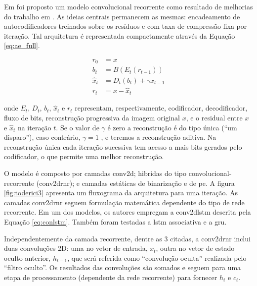 Em \cite{FullResolution2017Toderici} foi proposto um modelo convolucional recorrente como resultado de melhorias do trabalho em \cite {Variable2016Toderici}. As ideias centrais permanecem as mesmas: encadeamento de autocodificadores treinados sobre os resíduos e com taxa de compressão fixa por iteração.  Tal arquitetura é representada compactamente através da Equação \ref{eq:ae_full}. 

\begin{equation}
\label{eq:ae_full}
\begin{aligned}
r_{0} &=x\\
b_{t} &= B(E_{t}(r_{t-1})) \\
\hat{x}_{t} &= D_{t}(b_{t}) + \gamma \hat{x}_{t-1} \\
r_{t} &= x- \hat{x}_{t}
\end{aligned}
\end{equation}

\noindent onde $E_t$, $D_t$, $b_t$, $\hat{x}_t$ e $r_t$ representam, respectivamente, codificador, decodificador, fluxo de bits, reconstrução progressiva da imagem original $x$, e o residual entre $x$ e $\hat{x}_t$ na iteração $t$. Se o valor de $\gamma$ é zero a reconstrução é do tipo única (``um disparo''), caso contrário, $\gamma = 1$ , e teremos a reconstrução aditiva. Na reconstrução única cada iteração sucessiva tem acesso a mais bits gerados pelo codificador, o que permite uma melhor reconstrução. 



O modelo é composto por camadas \acrshort{conv2d}; hibridas do tipo convolucional-recorrente (\acrshort{conv2drnr}); e camadas estáticas de binarização e de \gls{pe}. A figura \ref{fig:toderici3} apresenta um fluxograma da arquitetura para uma iteração. As camadas \acrshort{conv2drnr} seguem formulação matemática dependente do tipo de rede recorrente.
Em um dos modelos, os autores empregam a \acrshort{conv2dlstm} descrita pela Equação \ref{eq:conlstm}. Também foram testadas a \acrshort{lstm} associativa e a \gls{gru}.

Independentemente da camada recorrente, dentre as 3 citadas, a \acrshort{conv2drnr} inclui duas convoluções 2D: uma no vetor de entrada, $x_t$, outra no vetor de estado oculto anterior, $h_{t-1}$, que será referida como ``convolução oculta'' realizada pelo  ``filtro oculto''. Os resultados das convoluções são somados e seguem para uma etapa de processamento (dependente da rede recorrente) para fornecer $h_t$ e $c_t$.

